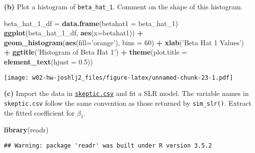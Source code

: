 \documentclass[]{article}
\newenvironment{Shaded}{\begin{snugshade}}{\end{snugshade}}
\newcommand{\KeywordTok}[1]{\textcolor[rgb]{0.13,0.29,0.53}{\textbf{#1}}}
\newcommand{\DataTypeTok}[1]{\textcolor[rgb]{0.13,0.29,0.53}{#1}}
\newcommand{\DecValTok}[1]{\textcolor[rgb]{0.00,0.00,0.81}{#1}}
\newcommand{\FloatTok}[1]{\textcolor[rgb]{0.00,0.00,0.81}{#1}}
\newcommand{\StringTok}[1]{\textcolor[rgb]{0.31,0.60,0.02}{#1}}
\newcommand{\OperatorTok}[1]{\textcolor[rgb]{0.81,0.36,0.00}{\textbf{#1}}}
\newcommand{\NormalTok}[1]{#1}
\begin{document}
\textbf{(b)} Plot a histogram of \texttt{beta\_hat\_1}. Comment on the
shape of this histogram.

\begin{Shaded}
\begin{Highlighting}[]
\NormalTok{beta_hat_1_df =}\StringTok{ }\KeywordTok{data.frame}\NormalTok{(}\DataTypeTok{betahat1 =}\NormalTok{ beta_hat_}\DecValTok{1}\NormalTok{)}
\KeywordTok{ggplot}\NormalTok{(beta_hat_1_df, }\KeywordTok{aes}\NormalTok{(}\DataTypeTok{x=}\NormalTok{betahat1)) }\OperatorTok{+}\StringTok{ }\KeywordTok{geom_histogram}\NormalTok{(}\KeywordTok{aes}\NormalTok{(}\DataTypeTok{fill=}\StringTok{'orange'}\NormalTok{), }\DataTypeTok{bins =} \DecValTok{60}\NormalTok{) }\OperatorTok{+}\StringTok{ }\KeywordTok{xlab}\NormalTok{(}\StringTok{'Beta Hat 1 Values'}\NormalTok{) }\OperatorTok{+}\StringTok{ }\KeywordTok{ggtitle}\NormalTok{(}\StringTok{'Histogram of Beta Hat 1'}\NormalTok{) }\OperatorTok{+}\StringTok{ }\KeywordTok{theme}\NormalTok{(}\DataTypeTok{plot.title =} \KeywordTok{element_text}\NormalTok{(}\DataTypeTok{hjust =} \FloatTok{0.5}\NormalTok{))}
\end{Highlighting}
\end{Shaded}

\texttt{[image: w02-hw-joshlj2\_files/figure-latex/unnamed-chunk-23-1.pdf]}

\textbf{(c)} Import the data in \href{skeptic.csv}{\texttt{skeptic.csv}}
and fit a SLR model. The variable names in \texttt{skeptic.csv} follow
the same convention as those returned by \texttt{sim\_slr()}. Extract
the fitted coefficient for \(\beta_1\).

\begin{Shaded}
\begin{Highlighting}[]
\KeywordTok{library}\NormalTok{(readr)}
\end{Highlighting}
\end{Shaded}

\begin{verbatim}
## Warning: package 'readr' was built under R version 3.5.2
\end{verbatim}

\begin{Shaded}
\end{Shaded}
\end{document}
